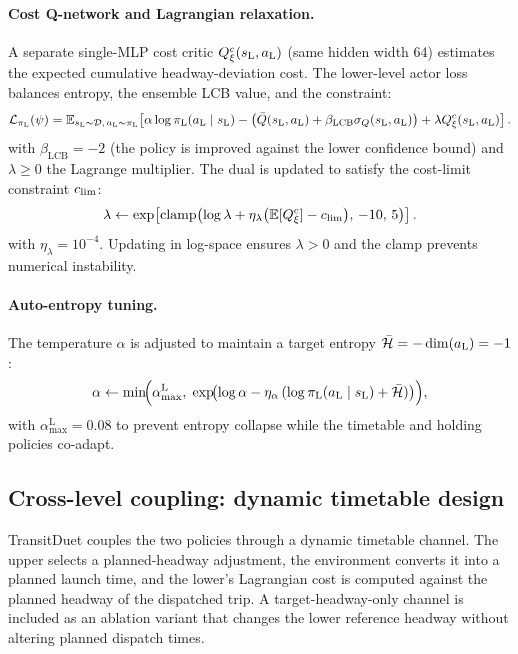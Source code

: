 \paragraph{Cost Q-network and Lagrangian relaxation.}
A separate single-MLP cost critic $Q^c_{\xi}(s_{\mathrm{L}}, a_{\mathrm{L}})$ (same hidden width 64) estimates the expected cumulative headway-deviation cost. The lower-level actor loss balances entropy, the ensemble LCB value, and the constraint:
{\footnotesize
\begin{equation}
\label{eq:lower_policy_loss}
    \mathcal{L}_{\pi_{\mathrm{L}}}(\psi) = \mathbb{E}_{s_{\mathrm{L}}\sim\mathcal{D},\,a_{\mathrm{L}}\sim\pi_{\mathrm{L}}}\!\left[\alpha\log\pi_{\mathrm{L}}(a_{\mathrm{L}}\mid s_{\mathrm{L}}) - \bigl(\bar{Q}(s_{\mathrm{L}},a_{\mathrm{L}})+\beta_{\mathrm{LCB}}\sigma_Q(s_{\mathrm{L}},a_{\mathrm{L}})\bigr) + \lambda Q^c_{\xi}(s_{\mathrm{L}},a_{\mathrm{L}})\right].
\end{equation}
}
with $\beta_{\mathrm{LCB}} = -2$ (the policy is improved against the lower confidence bound) and $\lambda \geq 0$ the Lagrange multiplier. The dual is updated to satisfy the cost-limit constraint $c_{\mathrm{lim}}$:
\begin{equation}
\label{eq:lambda_update}
    \lambda \leftarrow \exp\!\left[\mathrm{clamp}\!\left(\log\lambda + \eta_{\lambda}\bigl(\mathbb{E}[Q^c_{\xi}]-c_{\mathrm{lim}}\bigr),\,-10,\,5\right)\right].
\end{equation}
with $\eta_{\lambda} = 10^{-4}$.
Updating in log-space ensures $\lambda > 0$ and the clamp prevents numerical instability.

\paragraph{Auto-entropy tuning.}
The temperature $\alpha$ is adjusted to maintain a target entropy $\bar{\mathcal{H}} = -\dim(a_{\mathrm{L}}) = -1$:
\begin{equation}
\label{eq:alpha_update}
    \alpha \leftarrow \min\!\Bigl(\alpha_{\max}^{\mathrm{L}},\; \exp\!\bigl(\log\alpha - \eta_{\alpha}\,(\log \pi_{\mathrm{L}}(a_{\mathrm{L}} \mid s_{\mathrm{L}}) + \bar{\mathcal{H}})\bigr)\Bigr),
\end{equation}
with $\alpha_{\max}^{\mathrm{L}} = 0.08$ to prevent entropy collapse while the timetable and holding policies co-adapt.

\subsection{Cross-level coupling: dynamic timetable design}
\label{sec:tap}

TransitDuet couples the two policies through a dynamic timetable channel. The upper selects a planned-headway adjustment, the environment converts it into a planned launch time, and the lower's Lagrangian cost is computed against the planned headway of the dispatched trip. A target-headway-only channel is included as an ablation variant that changes the lower reference headway without altering planned dispatch times.


